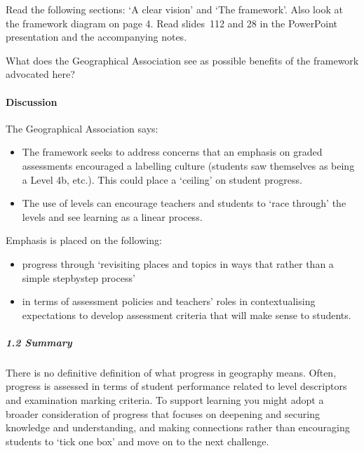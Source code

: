 \documentclass[letterpaper,10pt,english]{sphinxmanual}
\begin{document}
Read the following sections: ‘A clear vision’ and ‘The framework’. Also look at the framework diagram on page 4. Read slides 1\textendash{}12 and 28 in the PowerPoint presentation and the accompanying notes.

What does the Geographical Association see as possible benefits of the framework advocated here?


\paragraph{Discussion}
\label{\detokenize{content/session_00/Part_00_01:Discussion}}
The Geographical Association says:
\begin{itemize}
\item {} 
The framework seeks to address concerns that an emphasis on graded assessments encouraged a labelling culture (students saw themselves as being a Level 4b, etc.). This could place a ‘ceiling’ on student progress.

\item {} 
The use of levels can encourage teachers and students to ‘race through’ the levels and see learning as a linear process.

\end{itemize}

Emphasis is placed on the following:
\begin{itemize}
\item {} 
progress through ‘revisiting places and topics in ways that  rather than a simple step\sphinxhyphen{}by\sphinxhyphen{}step process’

\item {} 
 in terms of assessment policies and teachers’ roles in contextualising expectations to develop assessment criteria that will make sense to students.

\end{itemize}


\subparagraph{1.2 Summary}
\label{\detokenize{content/session_00/Part_00_01:1.2-Summary}}
There is no definitive definition of what progress in geography means. Often, progress is assessed in terms of student performance related to level descriptors and examination marking criteria. To support learning you might adopt a broader consideration of progress that focuses on deepening and securing knowledge and understanding, and making connections rather than encouraging students to ‘tick one box’ and move on to the next challenge.
\end{document}
